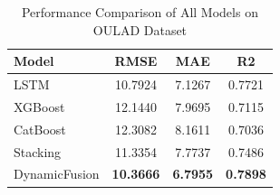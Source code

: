 \begin{table}[htbp]
\centering
\caption{Performance Comparison of All Models on OULAD Dataset}
\label{tab:main_results}
\begin{tabular}{lccc}
\hline
Model & RMSE & MAE & R2 \\
\hline
LSTM & 10.7924 & 7.1267 & 0.7721 \\
XGBoost & 12.1440 & 7.9695 & 0.7115 \\
CatBoost & 12.3082 & 8.1611 & 0.7036 \\
Stacking & 11.3354 & 7.7737 & 0.7486 \\
DynamicFusion & \textbf{10.3666} & \textbf{6.7955} & \textbf{0.7898} \\
\hline
\end{tabular}
\end{table}
